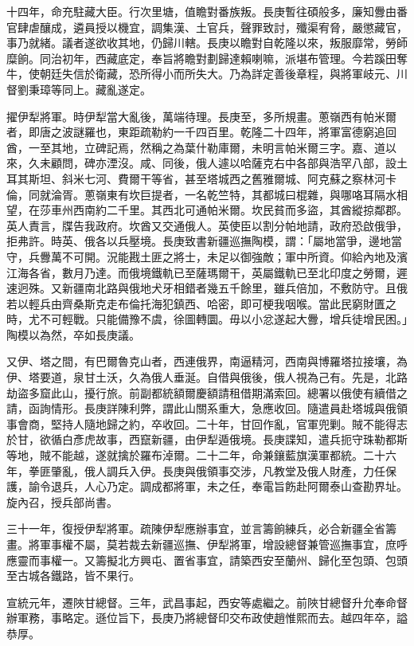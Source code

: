 \begin{pinyinscope}
十四年，命充駐藏大臣。行次里塘，值瞻對番族叛。長庚暫往碩般多，廉知釁由番官肆虐釀成，遴員授以機宜，調集漢、土官兵，聲罪致討，殲渠宥脅，嚴懲藏官，事乃就緒。議者遂欲收其地，仍歸川轄。長庚以瞻對自乾隆以來，叛服靡常，勞師糜餉。同治初年，西藏底定，奉旨將瞻對劃歸達賴喇嘛，派堪布管理。今若蹊田奪牛，使朝廷失信於衛藏，恐所得小而所失大。乃為詳定善後章程，與將軍岐元、川督劉秉璋等同上。藏亂遂定。

擢伊犁將軍。時伊犁當大亂後，萬端待理。長庚至，多所規畫。蔥嶺西有帕米爾者，即唐之波謎羅也，東距疏勒約一千四百里。乾隆二十四年，將軍富德窮追回酋，一至其地，立碑記焉，然稱之為葉什勒庫爾，未明言帕米爾三字。嘉、道以來，久未顧問，碑亦湮沒。咸、同後，俄人遽以哈薩克右中各部與浩罕八部，設土耳其斯坦、斜米七河、費爾干等省，甚至塔城西之舊雅爾城、阿克蘇之察林河卡倫，同就淪胥。蔥嶺東有坎巨提者，一名乾竺特，其都城曰棍雜，與哪咯耳隔水相望，在莎車州西南約二千里。其西北可通帕米爾。坎民貧而多盜，其酋縱掠鄰郡。英人責言，牒告我政府。坎酋又交通俄人。英使臣以割分帕地請，政府恐啟俄爭，拒弗許。時英、俄各以兵壓境。長庚致書新疆巡撫陶模，謂：「屬地當爭，邊地當守，兵釁萬不可開。況能戡土匪之將士，未足以御強敵；軍中所資。仰給內地及濱江海各省，數月乃達。而俄境鐵軌已至薩瑪爾干，英屬鐵軌已至北印度之勞爾，遲速迥殊。又新疆南北路與俄地犬牙相錯者幾五千餘里，雖兵倍加，不敷防守。且俄若以輕兵由齊桑斯克走布倫托海犯鎮西、哈密，即可梗我咽喉。當此民窮財匱之時，尤不可輕戰。只能備豫不虞，徐圖轉圜。毋以小忿遂起大釁，增兵徒增民困。」陶模以為然，卒如長庚議。

又伊、塔之間，有巴爾魯克山者，西連俄界，南逼精河，西南與博羅塔拉接壤，為伊、塔要道，泉甘土沃，久為俄人垂涎。自借與俄後，俄人視為己有。先是，北路劫盜多窟此山，擾行旅。前副都統額爾慶額請租借期滿索回。總署以俄使有續借之請，函詢情形。長庚詳陳利弊，謂此山關系重大，急應收回。隨遣員赴塔城與俄領事會商，堅持人隨地歸之約，卒收回。二十年，甘回作亂，官軍兜剿。賊不能得志於甘，欲循白彥虎故事，西竄新疆，由伊犁遁俄境。長庚諜知，遣兵扼守珠勒都斯等地，賊不能越，遂就擒於羅布淖爾。二十二年，命兼鑲藍旗漢軍都統。二十六年，拳匪肇亂，俄人調兵入伊。長庚與俄領事交涉，凡教堂及俄人財產，力任保護，諭令退兵，人心乃定。調成都將軍，未之任，奉電旨飭赴阿爾泰山查勘界址。旋內召，授兵部尚書。

三十一年，復授伊犁將軍。疏陳伊犁應辦事宜，並言籌餉練兵，必合新疆全省籌畫。將軍事權不屬，莫若裁去新疆巡撫、伊犁將軍，增設總督兼管巡撫事宜，庶呼應靈而事權一。又籌擬北方興屯、置省事宜，請築西安至蘭州、歸化至包頭、包頭至古城各鐵路，皆不果行。

宣統元年，遷陜甘總督。三年，武昌事起，西安等處繼之。前陜甘總督升允奉命督辦軍務，事略定。遜位旨下，長庚乃將總督印交布政使趙惟熙而去。越四年卒，謚恭厚。


\end{pinyinscope}
